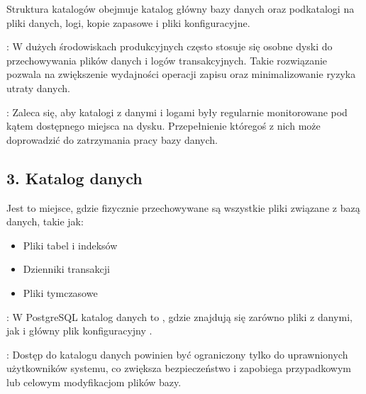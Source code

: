 \documentclass[a4paper,11pt,openany,english]{sphinxmanual}
\begin{document}
\sphinxAtStartPar
Struktura katalogów obejmuje katalog główny bazy danych oraz podkatalogi na pliki danych, logi, kopie zapasowe i pliki konfiguracyjne.

\sphinxAtStartPar
{}: W dużych środowiskach produkcyjnych często stosuje się osobne dyski do przechowywania plików danych i logów transakcyjnych. Takie rozwiązanie pozwala na zwiększenie wydajności operacji zapisu oraz minimalizowanie ryzyka utraty danych.

\sphinxAtStartPar
{}: Zaleca się, aby katalogi z danymi i logami były regularnie monitorowane pod kątem dostępnego miejsca na dysku. Przepełnienie któregoś z nich może doprowadzić do zatrzymania pracy bazy danych.


\subsection{3. Katalog danych}
\label{\detokenize{rozdzial2/Konfiguracja_baz_danych/Konfiguracja_baz_danych:katalog-danych}}
\sphinxAtStartPar
Jest to miejsce, gdzie fizycznie przechowywane są wszystkie pliki związane z bazą danych, takie jak:
\begin{itemize}
\item {} 
\sphinxAtStartPar
Pliki tabel i indeksów

\item {} 
\sphinxAtStartPar
Dzienniki transakcji

\item {} 
\sphinxAtStartPar
Pliki tymczasowe

\end{itemize}

\sphinxAtStartPar
{}: W PostgreSQL katalog danych to , gdzie znajdują się zarówno pliki z danymi, jak i główny plik konfiguracyjny .

\sphinxAtStartPar
{}: Dostęp do katalogu danych powinien być ograniczony tylko do uprawnionych użytkowników systemu, co zwiększa bezpieczeństwo i zapobiega przypadkowym lub celowym modyfikacjom plików bazy.
\end{document}
